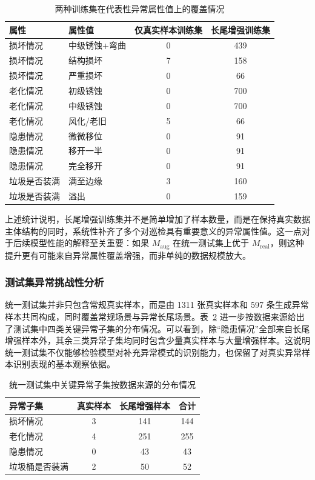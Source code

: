 \begin{table}[htbp]
\centering
\caption{两种训练集在代表性异常属性值上的覆盖情况}
\label{tab:tail_coverage_train}
\setlength{\tabcolsep}{5pt}
\begin{tabular}{llcc}
\toprule
\textbf{属性} & \textbf{属性值} & \textbf{仅真实样本训练集} & \textbf{长尾增强训练集}\\
\midrule
损坏情况 & 中级锈蚀+弯曲 & 0 & 439\\
损坏情况 & 结构损坏 & 7 & 158\\
损坏情况 & 严重损坏 & 0 & 66\\
老化情况 & 初级锈蚀 & 0 & 700\\
老化情况 & 中级锈蚀 & 0 & 700\\
老化情况 & 风化/老旧 & 5 & 66\\
隐患情况 & 微微移位 & 0 & 91\\
隐患情况 & 移开一半 & 0 & 91\\
隐患情况 & 完全移开 & 0 & 91\\
垃圾是否装满 & 满至边缘 & 3 & 160\\
垃圾是否装满 & 溢出 & 0 & 159\\
\bottomrule
\end{tabular}
\end{table}

上述统计说明，长尾增强训练集并不是简单增加了样本数量，而是在保持真实数据主体结构的同时，系统性补齐了多个对巡检具有重要意义的异常属性值。这一点对于后续模型性能的解释至关重要：如果 $M_{\mathrm{aug}}$ 在统一测试集上优于 $M_{\mathrm{real}}$，则这种提升更有可能来自异常属性覆盖增强，而非单纯的数据规模放大。

\subsubsection{测试集异常挑战性分析}

统一测试集并非只包含常规真实样本，而是由 1311 张真实样本和 597 条生成异常样本共同构成，同时覆盖常规场景与异常长尾场景。表~\ref{tab:test_tail_distribution} 进一步按数据来源给出了测试集中四类关键异常子集的分布情况。可以看到，除“隐患情况”全部来自长尾增强样本外，其余三类异常子集均同时包含少量真实样本与大量增强样本。这说明统一测试集不仅能够检验模型对补充异常模式的识别能力，也保留了对真实异常样本识别表现的基本观察依据。

\begin{table}[htbp]
\centering
\caption{统一测试集中关键异常子集按数据来源的分布情况}
\label{tab:test_tail_distribution}
\setlength{\tabcolsep}{5pt}
\begin{tabular}{lccc}
\toprule
\textbf{异常子集} & \textbf{真实样本} & \textbf{长尾增强样本} & \textbf{合计}\\
\midrule
损坏情况 & 3 & 141 & 144\\
老化情况 & 4 & 251 & 255\\
隐患情况 & 0 & 43 & 43\\
垃圾桶是否装满 & 2 & 50 & 52\\
\bottomrule
\end{tabular}
\end{table}

